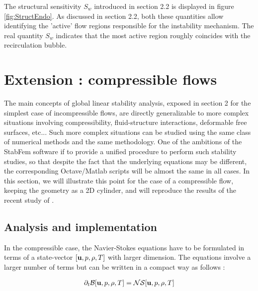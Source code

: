 \documentclass[twocolumn,10pt]{asme2ej}
\begin{document}
The structural sensitivity $S_w$ introduced in section 2.2 is displayed in figure \ref{fig:StructEndo}. As discussed in section 2.2, both these quantities allow identifying the 'active' flow regions responsible for the instability mechanism. The real quantity $S_w$ indicates that the most active region roughly coincides with the recirculation bubble. 


\section{Extension : compressible flows}  

The main concepts of global linear stability analysis, exposed in section 2 for the simplest case of incompressible flows, are directly generalizable to more complex situations involving compressibility, fluid-structure interactions, deformable free surfaces, etc... Such more complex situations can be studied using the same class of numerical methods and the same methodology. One of the ambitions of the StabFem software if to provide a unified procedure to perform such stability studies, so that despite the fact that the underlying equations may be different, the corresponding Octave/Matlab scripts will be almost the same in all cases. In this section, we will illustrate this point for the case of a compressible flow, keeping the geometry as a 2D cylinder, and will reproduce the results of the recent study of \cite{Fani2018}.

\subsection{Analysis and implementation}

In the compressible case, the Navier-Stokes equations have to be formulated in terms of a state-vector $[{\bf u},p,\rho,T]$ with larger dimension. 
The equations involve a larger number of terms but can be written in a compact way as follows :


\begin{eqnarray} \label{NSprimitive}
\partial_t {\cal B} [{\bf u},p,\rho,T] = {\cal NS}  [{\bf u},p,\rho,T] 
\end{eqnarray}
\end{document}
